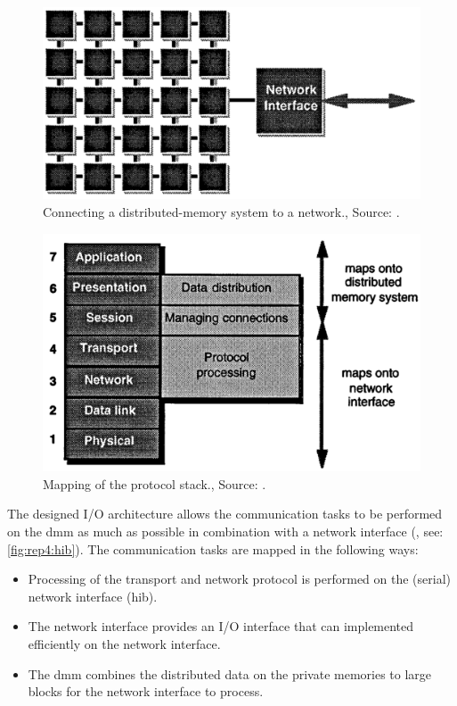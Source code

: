 \begin{figure}
    \centering
	\includegraphics[width=0.95\linewidth]{Figures/Rep4DistrMemSys.png}
	\caption{Connecting a distributed-memory system to a network., Source: \cite{steenkiste1997high}.} 
    \label{fig:rep4:conndistrmem}
\end{figure}

\begin{figure}
    \centering
	\includegraphics[width=0.95\linewidth]{Figures/Rep4OSI.png}
	\caption{Mapping of the protocol stack., Source: \cite{steenkiste1997high}.} 
    \label{fig:rep4:osi}
\end{figure}

The designed I/O architecture allows the communication tasks to be performed on the \ac{dmm} as much as possible in combination with a network interface (, see: \cref{fig:rep4:hib}).
The communication tasks are mapped in the following ways:
\begin{itemize}
    \item Processing of the transport and network protocol is performed on the (serial) network interface (\ac{hib}).
    \item The network interface provides an I/O interface that can implemented efficiently on the network interface.
    \item The \ac{dmm} combines the distributed data on the private memories to large blocks for the network interface to process.
\end{itemize}

